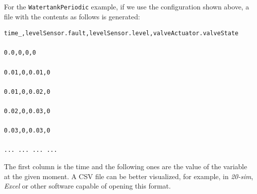 \documentclass{crescendorepchap}
\begin{document}
For the \texttt{WatertankPeriodic} example, if we use the configuration
shown above, a file with the contents as follows is generated:\newpage

\begin{verbatim}
time_,levelSensor.fault,levelSensor.level,valveActuator.valveState

0.0,0,0,0

0.01,0,0.01,0

0.01,0,0.02,0

0.02,0,0.03,0

0.03,0,0.03,0

... ... ... ...
\end{verbatim}

The first column is the time and the following ones are the value of the
variable at the given moment. A CSV file can be better visualized, for
example, in \emph{20-sim}, \emph{Excel} or other software capable of
opening this format.





\end{document}
